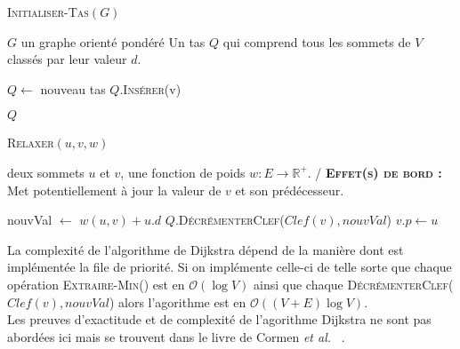 
\begin{algorithm}
	\caption{\textsc {Initialiser-Tas}$(G)$}
	 \label{algo:initTas}
	\begin{algorithmic}[1]
		\REQUIRE $G$ un graphe orienté pondéré
		\ENSURE Un tas $Q$ qui comprend tous les sommets de $V$ classés par leur valeur $d$.
		
		\STATE $Q \leftarrow$ nouveau tas 
			\STATE $Q.$\textsc{Insérer}(v)
		\ENDFOR
		
		\RETURN $Q$
	
			
\end{algorithmic}
		
\end{algorithm}


\begin{algorithm}
	\caption{\textsc {Relaxer}$(u,v,w)$}
	 \label{algo:relaxer}
	\begin{algorithmic}[1]
		\REQUIRE deux sommets $u$ et $v$, une fonction de poids $w : E \rightarrow \mathbb{R}^{+}$.
		\ENSURE / \textbf{\textsc{Effet(s) de bord :}} Met potentiellement à jour la  valeur de $v$ et son prédécesseur.
		
		\STATE nouvVal $\leftarrow$ $w(u,v) + u.d$
			\STATE $Q.$\textsc{DécrémenterClef}($Clef(v),nouvVal$)
			\STATE $v.p \leftarrow u$
		\ENDIF
	
			
\end{algorithmic}
		
\end{algorithm}

La complexité de l'algorithme de Dijkstra dépend de la manière dont est implémentée la file de priorité. Si on implémente celle-ci de telle sorte que chaque opération \textsc{Extraire-Min}() est en $\mathcal{O}(\log V)$ ainsi que chaque \textsc{DécrémenterClef}($Clef(v),nouvVal$) alors l'agorithme est en $\mathcal{O}((V + E) \log V)$.\\
Les preuves d'exactitude et de complexité de l'agorithme Dijkstra ne sont pas abordées ici mais se trouvent dans le livre de Cormen \emph{et al.} ~\cite{Cormen:2009:IA:580470}.



\clearpage

